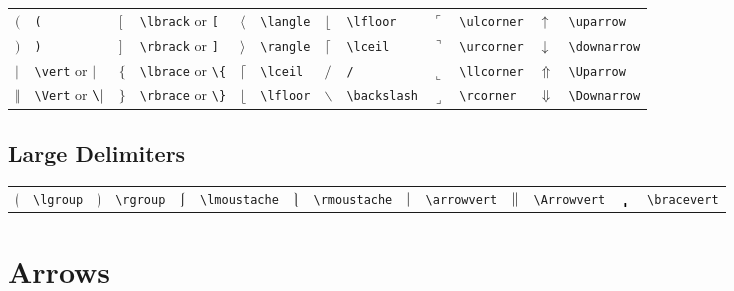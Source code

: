 \documentclass[10pt, english]{article}
\begin{document}
	\begin{center}
		\scriptsize
	\begin{tabular}{ll|ll|ll|ll|ll|ll}
		$($ & \verb|(| & $\lbrack$ & \verb|\lbrack| or \verb|[| & $\langle$ & \verb|\langle| & $\lfloor$ & \verb|\lfloor| & $\ulcorner$ & \verb|\ulcorner| & $\uparrow$ & \verb|\uparrow| \\
		$)$ & \verb|)| & $\rbrack$ & \verb|\rbrack| or \verb|]| & $\rangle$ & \verb|\rangle| & $\lceil$ & \verb|\lceil| & $\urcorner$ & \verb|\urcorner| & $\downarrow$ & \verb|\downarrow| \\
		$\vert$ & \verb|\vert| or $\mathtt{|}$ & $\lbrace$ & \verb|\lbrace| or \verb|\{| & $\lceil$ & \verb|\lceil| & $/$ & \verb|/| & $\llcorner$ & \verb|\llcorner| & $\Uparrow$ & \verb|\Uparrow| \\
		$\Vert$ & \verb|\Vert| or $\verb|\||$ & $\rbrace$ & \verb|\rbrace| or \verb|\}| & $\lfloor$ & \verb|\lfloor| & $\backslash$ & \verb|\backslash| & $\lrcorner$ & \verb|\rcorner| & $\Downarrow$ & \verb|\Downarrow| \\
	\end{tabular}
	\end{center}

	\subsection{Large Delimiters}

	\begin{center}
		\scriptsize
	\begin{tabular}{ll|ll|ll|ll|ll|ll|ll}
		$\lgroup$ & \verb|\lgroup| & $\rgroup$ & \verb|\rgroup| & $\lmoustache$ & \verb|\lmoustache| & $\rmoustache$ & \verb|\rmoustache| & $\arrowvert$ & \verb|\arrowvert| & $\Arrowvert$ & \verb|\Arrowvert| & $\bracevert$ & \verb|\bracevert| \\
	\end{tabular}
	\end{center}

\section{Arrows}	
\end{document}
